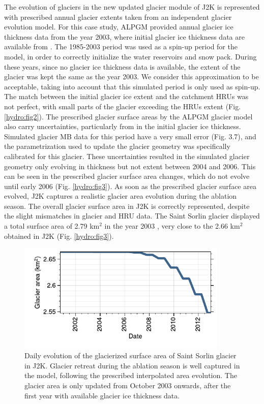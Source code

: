 The evolution of glaciers in the new updated glacier module of J2K is represented with prescribed annual glacier extents taken from an independent glacier evolution model. For this case study, ALPGM provided annual glacier ice thickness data from the year 2003, where initial glacier ice thickness data are available from \citet{farinotti_consensus_2019}. The 1985-2003 period was used as a spin-up period for the model, in order to correctly initialize the water reservoirs and snow pack. During these years, since no glacier ice thickness data is available, the extent of the glacier was kept the same as the year 2003. We consider this approximation to be acceptable, taking into account that this simulated period is only used as spin-up. The match between the initial glacier ice extent and the catchment HRUs was not perfect, with small parts of the glacier exceeding the HRUs extent (Fig. \ref{hydro:fig2}). The prescribed glacier surface areas by the ALPGM glacier model also carry uncertainties, particularly from in the initial glacier ice thickness. Simulated glacier MB data for this period have a very small error (Fig. 3.7), and the parametrization used to update the glacier geometry was specifically calibrated for this glacier. These uncertainties resulted in the simulated glacier geometry only evolving in thickness but not extent between 2004 and 2006. This can be seen in the prescribed glacier surface area changes, which do not evolve until early 2006 (Fig. \ref{hydro:fig3}). As soon as the prescribed glacier surface area evolved, J2K captures a realistic glacier area evolution during the ablation season. The overall glacier surface area in J2K is correctly represented, despite the slight mismatches in glacier and HRU data. The Saint Sorlin glacier displayed a total surface area of 2.79 km$^{2}$ in the year 2003 \citep{gardent_multitemporal_2014}, very close to the 2.66 km$^{2}$ obtained in J2K (Fig. \ref{hydro:fig3}). 

\begin{figure}[h]
\centering
\includegraphics[width=10cm]{Figures/hydro/Figure_3.pdf}
\caption{Daily evolution of the glacierized surface area of Saint Sorlin glacier in J2K. Glacier retreat during the ablation season is well captured in the model, following the prescribed interpolated area evolution. The glacier area is only updated from October 2003 onwards, after the first year with available glacier ice thickness data.} 
\label{hydro:fig4}
\end{figure}

